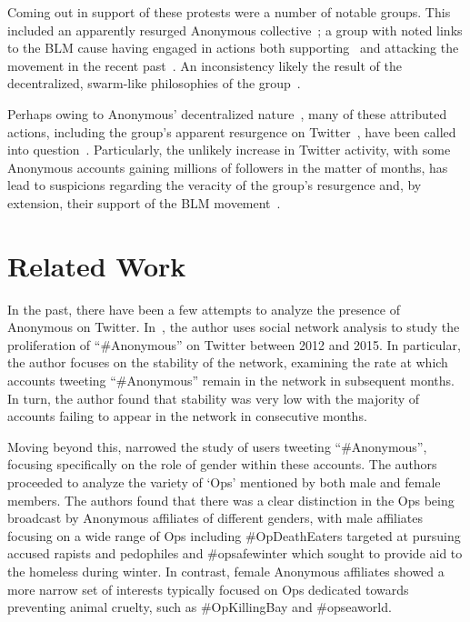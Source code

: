 \documentclass[letterpaper]{article}
\begin{document}
Coming out in support of these protests were a number of notable groups. This included an apparently resurged Anonymous collective~\cite{Independant2020}; a group with noted links to the BLM cause having engaged in actions both supporting~\cite{IBT2016} and attacking the movement in the recent past~\cite{Verge2016}. An inconsistency likely the result of the decentralized, swarm-like philosophies of the group~\cite{Uitermark2017}.

Perhaps owing to Anonymous' decentralized nature~\cite{Uitermark2017}, many of these attributed actions, including the group's apparent resurgence on Twitter~\cite{Independant2020}, have been called into question~\cite{Telegraph2020}. Particularly, the unlikely increase in Twitter activity, with some Anonymous accounts gaining millions of followers in the matter of months, has lead to suspicions regarding the veracity of the group's resurgence and, by extension, their support of the BLM movement~\cite{Telegraph2020}.

\section{Related Work}

In the past, there have been a few attempts to analyze the presence of Anonymous on Twitter. In~\cite{Beraldo2017}, the author uses social network analysis to study the proliferation of ``\#Anonymous'' on Twitter between 2012 and 2015. In particular, the author focuses on the stability of the network, examining the rate at which accounts tweeting  ``\#Anonymous'' remain in the network in subsequent months. In turn, the author found that stability was very low with the majority of accounts failing to appear in the network in consecutive months.

Moving beyond this, \citet{McGovern2020} narrowed the study of users tweeting ``\#Anonymous'', focusing specifically on the role of gender within these accounts. The authors proceeded to analyze the variety of `Ops' mentioned by both male and female members. The authors found that there was a clear distinction in the Ops being broadcast by Anonymous affiliates of different genders, with male affiliates focusing on a wide range of Ops including \#OpDeathEaters targeted at pursuing accused rapists and pedophiles and \#opsafewinter which sought to provide aid to the homeless during winter. In contrast, female Anonymous affiliates showed a more narrow set of interests typically focused on Ops dedicated towards preventing animal cruelty, such as \#OpKillingBay and \#opseaworld.
\end{document}
